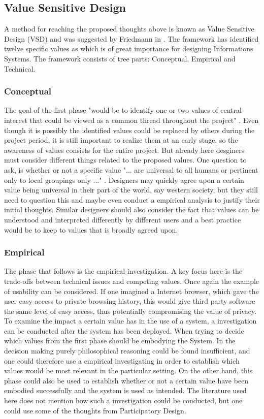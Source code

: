 \subsection{Value Sensitive Design}
\label{subsec:vsd_framework}
A method for reaching the proposed thoughts above is known as Value Sensitive Design (VSD) and was suggested by Friedmann in . The framework has identified twelve specific values as which is of great importance for designing Informations Systems. The framework consists of tree parts: Conceptual, Empirical and Technical.

\subsubsection{Conceptual}
The goal of the first phase "would be to identify one or two values of central interest that could be viewed as a common thread throughout the project" . Even though it is possibly the identified values could be replaced by others during the project period, it is still important to realize them at an early stage, so the awareness of values consists for the entire project. But already here desginers must consider different things related to the proposed values. One question to ask, is whether or not a specific value "... are universal to all humans or pertinent only to local groupings only ..." . Designers may quickly agree upon a certain value being universal in their part of the world, say western society, but they still need to question this and maybe even conduct a empirical analysis to justify their initial thoughts. Similar designers should also consider the fact that values can be understood and interpreted differently by different users and a best practice would be to keep to values that is broadly agreed upon. 

\subsubsection{Empirical}
The phase that follows is the empirical investigation. A key focus here is the trade-offs between technical issues and competing values. Once again the example of usability can be considered. If one imagined a Internet browser, which gave the user easy access to private browsing history, this would give third party software the same level of easy access, thus potentially compromising the value of privacy. To examine the impact a certain value has in the use of a system, a investigation can be conducted after the system has been deployed. When trying to decide which values from the first phase should be embodying the System. In the decision making purely philosophical reasoning could be found insufficient, and one could therefore use a empirical investigating in order to establish which values would be most relevant in the particular setting. On the other hand, this phase could also be used to establish whether or not a certain  value have been embodied successfully and the system is used as intended. The literature used here does not mention how such a investigation could be conducted, but one could use some of the thoughts from Participatory Design. 

